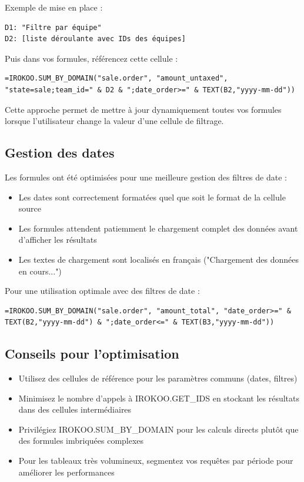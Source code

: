 \documentclass[12pt, a4paper]{article}
\begin{document}
Exemple de mise en place :
\begin{lstlisting}
D1: "Filtre par équipe"
D2: [liste déroulante avec IDs des équipes]
\end{lstlisting}

Puis dans vos formules, référencez cette cellule :
\begin{lstlisting}
=IROKOO.SUM_BY_DOMAIN("sale.order", "amount_untaxed", "state=sale;team_id=" & D2 & ";date_order>=" & TEXT(B2,"yyyy-mm-dd"))
\end{lstlisting}

Cette approche permet de mettre à jour dynamiquement toutes vos formules lorsque l'utilisateur change la valeur d'une cellule de filtrage.

\subsection{Gestion des dates}

Les formules ont été optimisées pour une meilleure gestion des filtres de date :

\begin{itemize}
    \item Les dates sont correctement formatées quel que soit le format de la cellule source
    \item Les formules attendent patiemment le chargement complet des données avant d'afficher les résultats
    \item Les textes de chargement sont localisés en français ("Chargement des données en cours...")
\end{itemize}

Pour une utilisation optimale avec des filtres de date :

\begin{lstlisting}
=IROKOO.SUM_BY_DOMAIN("sale.order", "amount_total", "date_order>=" & TEXT(B2,"yyyy-mm-dd") & ";date_order<=" & TEXT(B3,"yyyy-mm-dd"))
\end{lstlisting}

\subsection{Conseils pour l'optimisation}

\begin{itemize}
    \item Utilisez des cellules de référence pour les paramètres communs (dates, filtres)
    \item Minimisez le nombre d'appels à IROKOO.GET\_IDS en stockant les résultats dans des cellules intermédiaires
    \item Privilégiez IROKOO.SUM\_BY\_DOMAIN pour les calculs directs plutôt que des formules imbriquées complexes
    \item Pour les tableaux très volumineux, segmentez vos requêtes par période pour améliorer les performances
\end{itemize}
\end{document}
